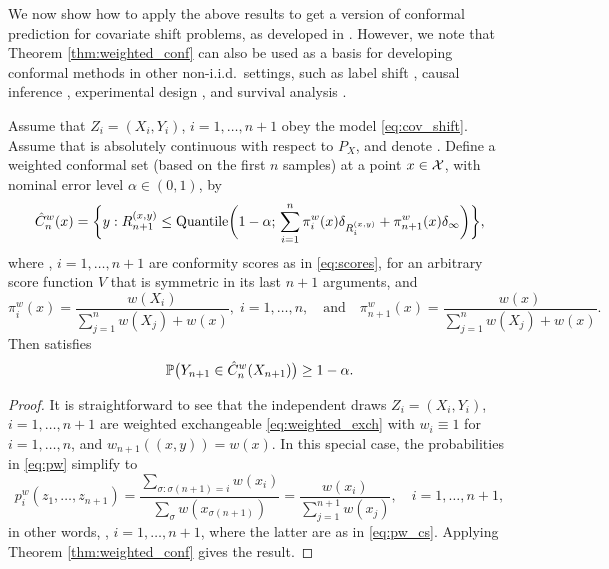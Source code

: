 \documentclass{article}
\begin{document}
We now show how to apply the above results to get a version of conformal
prediction for covariate shift problems, as developed in
\citet{tibshirani2019conformal}. However, we note that Theorem 
\ref{thm:weighted_conf} can also be used as a basis for developing conformal
methods in other non-i.i.d.\ settings, such as label shift
\citep{podkopaev2021distribution}, causal inference \citep{lei2021conformal},
experimental design \citep{fannjiang2022conformal}, and survival analysis
\citep{candes2023conformalized}. 

\begin{corollary}
\label{cor:weighted_conf_cs}
Assume that $Z_i=(X_i,Y_i)$, $i=1,\dots,n+1$ obey the model
\eqref{eq:cov_shift}.  Assume that  is absolutely continuous with
respect to $P_X$, and denote .  Define a weighted
conformal set (based on the first $n$ samples) at a point $x \in \mathcal{X}$, with
nominal error level $\alpha \in (0,1)$, by 
\begin{equation}
\label{eq:weighted_conf_cs}
\hat{C}^w_n(x) = \bigg\{ y : R_{n+1}^{(x,y)} \leq \mathrm{Quantile}\bigg( 1-\alpha; 
\, \sum_{i=1}^n \pi^w_i(x) \delta_{R_i^{(x,y)}} + \pi^w_{n+1}(x) \delta_\infty 
\bigg) \bigg\}, 
\end{equation}
where , $i=1,\ldots,n+1$ are conformity scores as in
\eqref{eq:scores}, for an arbitrary score function $V$ that is symmetric in its
last $n+1$ arguments, and
\begin{equation}
\label{eq:pw_cs}
\pi^w_i(x) = \frac{w(X_i)}{\sum_{j=1}^n w(X_j) + w(x)}, \; i=1,\ldots,n, 
\quad \text{and} \quad 
\pi^w_{n+1}(x) = \frac{w(x)}{\sum_{j=1}^n w(X_j) + w(x)}. 
\end{equation}
Then  satisfies 
\begin{equation}
\label{eq:weighted_cov_cs}
\mathbb{P}\big( Y_{n+1} \in \hat{C}^w_n(X_{n+1}) \big) \geq 1-\alpha. 
\end{equation}
\end{corollary}

\begin{proof}
It is straightforward to see that the independent draws $Z_i = (X_i,Y_i)$,
$i=1,\ldots,n+1$ are weighted exchangeable \eqref{eq:weighted_exch} with
$w_i\equiv 1$ for $i=1,\ldots,n$, and $w_{n+1}((x,y))=w(x)$. In this special
case, the probabilities in \eqref{eq:pw} simplify to  
\[
p^w_i(z_1,\ldots,z_{n+1}) = \frac{\sum_{\sigma : \sigma(n+1)=i}
  w(x_i)}{\sum_\sigma w(x_{\sigma(n+1)})} =
\frac{w(x_i)}{\sum_{j=1}^{n+1}w(x_j)}, \quad i=1,\ldots,n+1,
\]
in other words, ,
$i=1,\ldots,n+1$, where the latter are as in \eqref{eq:pw_cs}. Applying Theorem 
\ref{thm:weighted_conf} gives the result.  \end{proof}  
\end{document}
